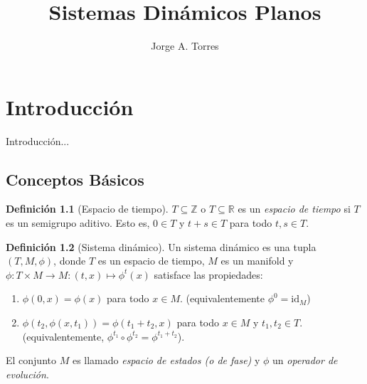 \documentclass[11pt]{book}
\theoremstyle{definition}
\newtheorem{definition}{Definición}
\numberwithin{definition}{section}
\theoremstyle{theorem}
\numberwithin{theorem}{section}
\numberwithin{lemma}{section}
\numberwithin{corollary}{section}
\theoremstyle{plain}
\numberwithin{example}{section}
\begin{document}
\title{Sistemas Dinámicos Planos}
\author{Jorge A. Torres}
\maketitle

\tableofcontents

\chapter{Introducción}
\label{cap:introduccion}

Introducción...

\section{Conceptos Básicos}

\begin{definition}[Espacio de tiempo] $T \subseteq \mathbb{Z}$ o $T \subseteq \mathbb{R}$ es un \emph{espacio de tiempo} si $T$ es un semigrupo aditivo. Esto es, $0 \in T$ y $t + s \in T$ para todo $t,s \in T$.
\end{definition}
    
\begin{definition}[Sistema dinámico] \label{def:dynamicalsystem}
Un sistema din\'amico es una tupla $\left( T, M, \phi \right)$, donde $T$ es un espacio de tiempo, $M$ es un manifold y $\phi : T \times M \rightarrow M : \left( t, x \right) \mapsto \phi^t \left( x \right)$ satisface las propiedades:
  \begin{enumerate}[(D1)]
    \item $\phi \left( 0, x \right) = \phi \left( x \right)$ para todo $x \in
    M$. (equivalentemente $\phi^0 = \text{id}_M$)
    
    \item $\phi \left( t_2, \phi \left( x, t_1 \right) \right) = \phi \left(
    t_1 + t_2, x \right)$ para todo $x \in M$ y $t_1, t_2 \in T$.
    (equivalentemente, $\phi^{t_1} \circ \phi^{t_2} = \phi^{t_1 + t_2}$).
  \end{enumerate}

  El conjunto $M$ es llamado {\emph{espacio de estados (o de fase)}} y
  $\phi$ un {\emph{operador de evoluci\'on}}.
\end{definition}
\end{document}
